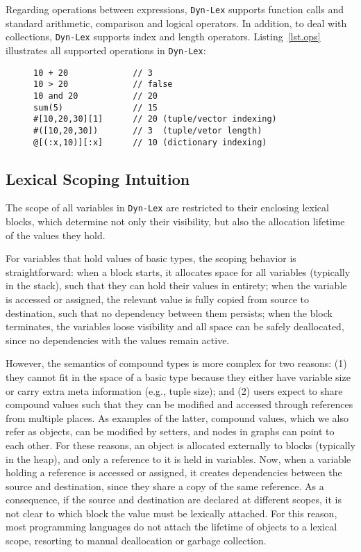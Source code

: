 \documentclass[12pt]{article}
\newcommand{\lex} {\texttt{Dyn-Lex}\xspace}
\begin{document}
Regarding operations between expressions, \lex supports function calls and
standard arithmetic, comparison and logical operators.
In addition, to deal with collections, \lex supports index and length
operators.
Listing~\ref{lst.ops} illustrates all supported operations in \lex:

\begin{figure}
\begin{lstlisting}[caption=Supported operations in \lex., label=lst.ops]
10 + 20             // 3
10 > 20             // false
10 and 20           // 20
sum(5)              // 15
#[10,20,30][1]      // 20 (tuple/vector indexing)
#([10,20,30])       // 3  (tuple/vetor length)
@[(:x,10)][:x]      // 10 (dictionary indexing)
\end{lstlisting}
\end{figure}

\subsection{Lexical Scoping Intuition}

The scope of all variables in \lex are restricted to their enclosing lexical
blocks, which determine not only their visibility, but also the allocation
lifetime of the values they hold.

For variables that hold values of basic types, the scoping behavior is
straightforward:
    when a block starts, it allocates space for all variables (typically in the
        stack), such that they can hold their values in entirety;
    when the variable is accessed or assigned, the relevant value is fully
        copied from source to destination, such that no dependency between them
        persists;
    when the block terminates, the variables loose visibility and all space can
        be safely deallocated, since no dependencies with the values remain
        active.

However, the semantics of compound types is more complex for two reasons:
    (1) they cannot fit in the space of a basic type because they either have
        variable size or carry extra meta information (e.g., tuple size); and
    (2) users expect to share compound values such that they can be modified
        and accessed through references from multiple places.
As examples of the latter, compound values, which we also refer as objects, can
be modified by setters, and nodes in graphs can point to each other.
%
For these reasons, an object is allocated externally to blocks (typically in
the heap), and only a reference to it is held in variables.
Now, when a variable holding a reference is accessed or assigned, it creates
dependencies between the source and destination, since they share a copy of the
same reference.
%
As a consequence, if the source and destination are declared at different
scopes, it is not clear to which block the value must be lexically attached.
For this reason, most programming languages do not attach the lifetime of
objects to a lexical scope, resorting to manual deallocation or garbage
collection.
\end{document}

